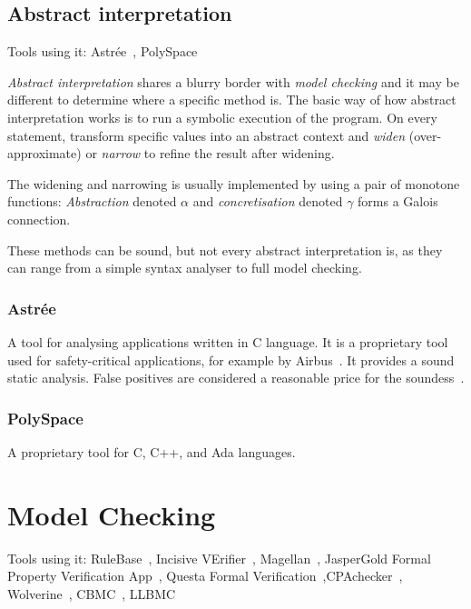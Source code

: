 \subsection{Abstract interpretation}
Tools using it: Astrée~\cite{Astree1,KrenaVojnarOverview}, PolySpace~\cite{KrenaVojnarOverview}

{\em Abstract interpretation} shares a blurry border with {\em model checking} and it may be different to determine where a specific method is. The basic way of how abstract interpretation works is to run a symbolic execution of the program. On every statement, transform specific values into an abstract context and {\em widen} (over-approximate) or {\em narrow} to refine the result after widening.

The widening and narrowing is usually implemented by using a pair of monotone functions: {\em Abstraction} denoted $\alpha$ and {\em concretisation} denoted $\gamma$ forms a Galois connection.

These methods can be sound, but not every abstract interpretation is, as they can range from a simple syntax analyser to full model checking.

\subsubsection{Astrée}
A tool for analysing applications written in C language. It is a proprietary tool used for safety-critical applications, for example by Airbus~\cite{KrenaVojnarOverview}. It provides a sound static analysis. False positives are considered a reasonable price for the soundess~\cite{Astree1}.

\subsubsection{PolySpace}
A proprietary tool for C, C++, and Ada languages.

\section{Model Checking}\label{chap:fav:modelChecking}
Tools using it: RuleBase~\cite{KrenaVojnarOverview}, Incisive VErifier~\cite{KrenaVojnarOverview}, Magellan~\cite{KrenaVojnarOverview}, JasperGold Formal Property Verification App~\cite{KrenaVojnarOverview}, Questa Formal Verification~\cite{KrenaVojnarOverview},CPAchecker~\cite{KrenaVojnarOverview}, Wolverine~\cite{KrenaVojnarOverview}, CBMC~\cite{KrenaVojnarOverview}, LLBMC~\cite{KrenaVojnarOverview}

